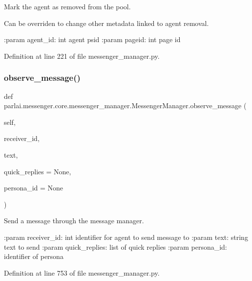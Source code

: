 \begin{DoxyVerb}Mark the agent as removed from the pool.

Can be overriden to change other metadata linked to agent removal.

:param agent_id:
    int agent psid
:param pageid:
    int page id
\end{DoxyVerb}
 

Definition at line 221 of file messenger\+\_\+manager.\+py.

\mbox{\label{classparlai_1_1messenger_1_1core_1_1messenger__manager_1_1MessengerManager_a71506a682b9284d8ae4121576e6140db}} 
\subsubsection{\texorpdfstring{observe\+\_\+message()}{observe\_message()}}
{\footnotesize\ttfamily def parlai.\+messenger.\+core.\+messenger\+\_\+manager.\+Messenger\+Manager.\+observe\+\_\+message (\begin{DoxyParamCaption}\item[{}]{self,  }\item[{}]{receiver\+\_\+id,  }\item[{}]{text,  }\item[{}]{quick\+\_\+replies = {\ttfamily None},  }\item[{}]{persona\+\_\+id = {\ttfamily None} }\end{DoxyParamCaption})}

\begin{DoxyVerb}Send a message through the message manager.

:param receiver_id:
    int identifier for agent to send message to
:param text:
    string text to send
:param quick_replies:
    list of quick replies
:param persona_id:
    identifier of persona
\end{DoxyVerb}
 

Definition at line 753 of file messenger\+\_\+manager.\+py.



